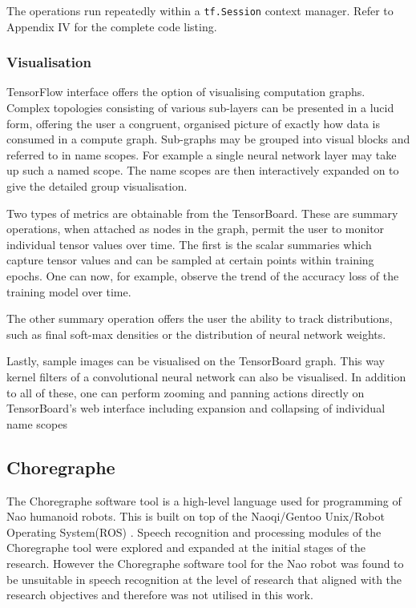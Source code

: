 The operations run repeatedly within a \texttt{tf.Session} context manager. Refer to Appendix IV for the complete code listing.

\subsubsection{Visualisation}
TensorFlow interface offers the option of visualising computation graphs. Complex topologies consisting of various sub-layers can be presented in a lucid form, offering the user a congruent, organised picture of exactly how data is consumed in a compute graph. Sub-graphs may be grouped into visual blocks and referred to in name scopes.  For example a single neural network layer may take up such a named scope. The name scopes are then interactively expanded on to give the detailed group visualisation.

Two types of metrics are obtainable from the TensorBoard. These are summary operations, when attached as nodes in the graph, permit the user to monitor individual tensor values over time.   The first is the scalar summaries which capture tensor values and can be sampled at certain points within training epochs. One can now, for example, observe the trend of the accuracy loss of the training model over time.

The other summary operation offers the user the ability to track distributions, such as final soft-max densities or the distribution of neural network weights. 

Lastly, sample images can be visualised on the TensorBoard graph. This way kernel filters of a convolutional neural network can also be visualised.  In addition to all of these, one can perform zooming and panning actions directly on TensorBoard's web interface including expansion and collapsing of individual name scopes

\subsection{Choregraphe}
The Choregraphe software tool is a high-level language used for programming of Nao humanoid robots.  This is built on top of the Naoqi/Gentoo Unix/Robot Operating System(ROS) \citep{pot2009choregraphe}.  Speech recognition and processing modules of the Choregraphe tool were explored and expanded at the initial stages of the research.  However the Choregraphe software tool for the Nao robot was found to be unsuitable in speech recognition at the level of research that aligned with the research objectives and therefore was not utilised in this work.

